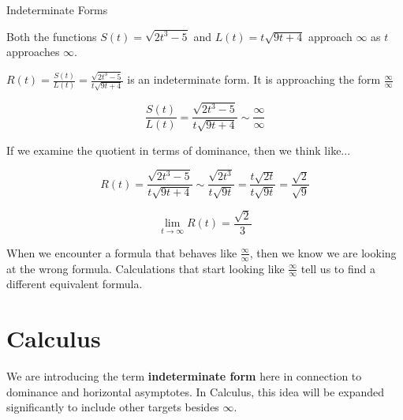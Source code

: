 \documentclass{ximera}
\begin{document}
\begin{example}  Indeterminate Forms


Both the functions $S(t) = \sqrt{2t^3 - 5}$ and $L(t) = t\sqrt{9t+4}$ approach $\infty$ as $t$ approaches $\infty$. 



$R(t) = \frac{S(t)}{L(t)} = \frac{\sqrt{2t^3 - 5}}{t\sqrt{9t+4}}$ is an indeterminate form. It is approaching the form $\frac{\infty}{\infty}$ 




\[
\frac{S(t)}{L(t)} = \frac{\sqrt{2t^3 - 5}}{t\sqrt{9t+4}} \sim \frac{\infty}{\infty}
\]





If we examine the quotient in terms of dominance, then we think like...

\[
R(t) =  \frac{\sqrt{2t^3 - 5}}{t \sqrt{9t+4}} \sim \frac{\sqrt{2t^3}}{t \sqrt{9t}} = \frac{t \sqrt{2t}}{t \sqrt{9t}} = \frac{\sqrt{2}}{\sqrt{9}}
\]



\[
\lim\limits_{t \to \infty} R(t) = \frac{\sqrt{2}}{3}
\]

\end{example}




When we encounter a formula that behaves like $\frac{\infty}{\infty}$, then we know we are looking at the wrong formula.   Calculations that start looking like $\frac{\infty}{\infty}$ tell us to find a different equivalent formula. 



























\section*{Calculus}


We are introducing the term \textbf{indeterminate form} here in connection to dominance and horizontal asymptotes.  In Calculus, this idea will be expanded significantly to include other targets besides $\infty$.
\end{document}
